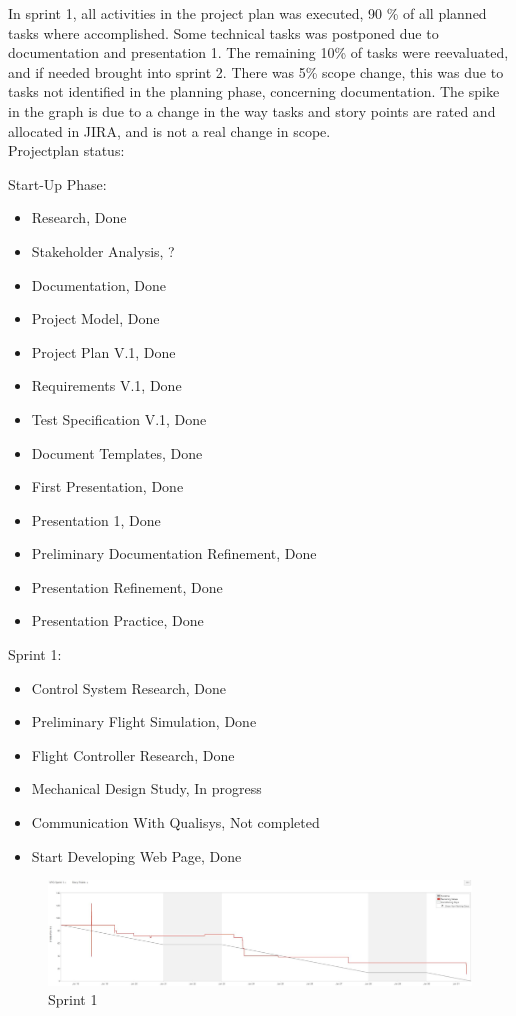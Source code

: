 In sprint 1, all activities in the project plan was executed, 90 \% of all planned tasks where accomplished. Some technical tasks was postponed due to documentation and presentation 1. The remaining 10\% of tasks were reevaluated, and if needed brought into sprint 2. 
There was 5\% scope change, this was due to tasks not identified in the planning phase, concerning documentation.
The spike in the graph is due to a change in the way tasks and story points are rated and allocated in JIRA, and is not a real change in scope. 
\\

Projectplan status:

	Start-Up Phase:
	\begin{itemize}
	\item Research, Done
	\item Stakeholder Analysis, ?
	\item Documentation, Done
	\item Project Model, Done
	\item Project Plan V.1, Done
	\item Requirements V.1, Done
	\item Test Specification V.1, Done
	\item Document Templates, Done
	\item First Presentation, Done
	\item Presentation 1, Done
    \item Preliminary Documentation Refinement, Done
	\item Presentation Refinement, Done
	\item Presentation Practice, Done
	\end{itemize}
	
	Sprint 1:
	\begin{itemize}
	\item Control System Research, Done
    \item Preliminary Flight Simulation, Done
	\item Flight Controller Research, Done
	\item Mechanical Design Study, In progress 
	\item Communication With Qualisys, Not completed
	\item Start Developing Web Page, Done   
	\end{itemize}

\begin{figure}[h]
        \centering
        \includegraphics[width = 1\textwidth]{VAPIQ-PICTURES/BDSprint1}
        \caption{Sprint 1}
    \end{figure}  

